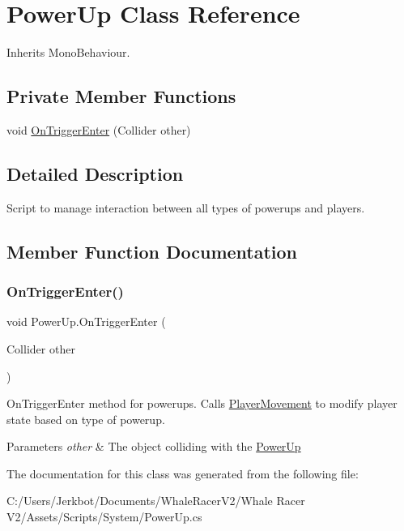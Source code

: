\hypertarget{class_power_up}{}\section{Power\+Up Class Reference}
\label{class_power_up}


Inherits Mono\+Behaviour.

\subsection*{Private Member Functions}
\begin{DoxyCompactItemize}
\item 
void \hyperlink{class_power_up_a9dbb3bf8ceb953ed5c2d77e387ab85a5}{On\+Trigger\+Enter} (Collider other)
\end{DoxyCompactItemize}


\subsection{Detailed Description}
Script to manage interaction between all types of powerups and players. 



\subsection{Member Function Documentation}
\mbox{\label{class_power_up_a9dbb3bf8ceb953ed5c2d77e387ab85a5}} 
\subsubsection{\texorpdfstring{On\+Trigger\+Enter()}{OnTriggerEnter()}}
{\footnotesize\ttfamily void Power\+Up.\+On\+Trigger\+Enter (\begin{DoxyParamCaption}\item[{Collider}]{other }\end{DoxyParamCaption})\hspace{0.3cm}{\ttfamily [private]}}



On\+Trigger\+Enter method for powerups. Calls \hyperlink{class_player_movement}{Player\+Movement} to modify player state based on type of powerup. 
\begin{DoxyParams}{Parameters}
{\em other} & The object colliding with the \hyperlink{class_power_up}{Power\+Up}\\
\hline
\end{DoxyParams}




The documentation for this class was generated from the following file\+:\begin{DoxyCompactItemize}
\item 
C\+:/\+Users/\+Jerkbot/\+Documents/\+Whale\+Racer\+V2/\+Whale Racer V2/\+Assets/\+Scripts/\+System/Power\+Up.\+cs\end{DoxyCompactItemize}
